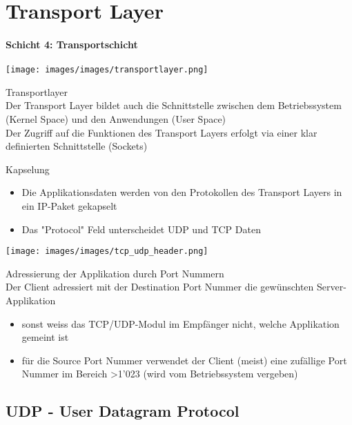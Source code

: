 \section{Transport Layer}
\paragraph{Schicht 4: Transportschicht}

\texttt{[image: images/images/transportlayer.png]}

\begin{definition}{Transportlayer}\\
    Der Transport Layer bildet auch die Schnittstelle zwischen dem Betriebssystem (Kernel Space) und den Anwendungen (User Space)\\
    Der Zugriff auf die Funktionen des Transport Layers erfolgt via einer klar definierten Schnittstelle (Sockets)
\end{definition}

\begin{definition}{Kapselung}
    \begin{itemize}
        \item Die Applikationsdaten werden von den Protokollen des Transport Layers in ein IP-Paket gekapselt
        \item Das "Protocol" Feld unterscheidet UDP und TCP Daten
    \end{itemize}
    \texttt{[image: images/images/tcp\_udp\_header.png]}
\end{definition}

\begin{concept}{Adressierung der Applikation durch Port Nummern}\\
    Der Client adressiert mit der Destination Port Nummer die gewünschten Server-Applikation
    \begin{itemize}
        \item sonst weiss das TCP/UDP-Modul im Empfänger nicht, welche Applikation gemeint ist
        \item für die Source Port Nummer verwendet der Client (meist) eine zufällige Port Nummer im Bereich >1'023 (wird vom Betriebssystem vergeben)
    \end{itemize}
\end{concept}
    
\columnbreak

\subsection{UDP - User Datagram Protocol}

